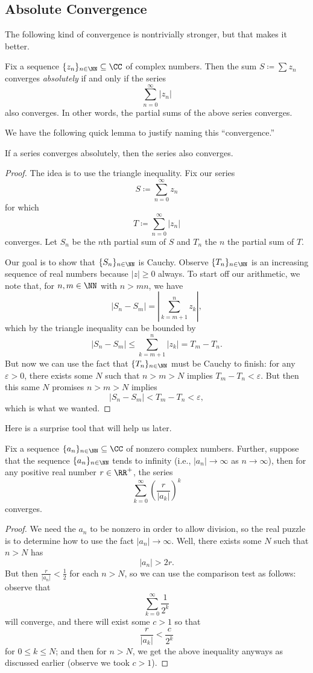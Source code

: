 \subsection{Absolute Convergence}
The following kind of convergence is nontrivially stronger, but that makes it better.
\begin{definition}
	Fix a sequence $\{z_n\}_{n\in\NN}\subseteq\CC$ of complex numbers. Then the sum $S\coloneqq\sum z_n$ converges \textit{absolutely} if and only if the series
	\[\sum_{n=0}^\infty|z_n|\]
	also converges. In other words, the partial sums of the above series converges.
\end{definition}
We have the following quick lemma to justify naming this ``convergence.''
\begin{lemma}
	If a series converges absolutely, then the series also converges.
\end{lemma}
\begin{proof}
	The idea is to use the triangle inequality. Fix our series
	\[S\coloneqq\sum_{n=0}^\infty z_n\]
	for which
	\[T\coloneqq\sum_{n=0}^\infty|z_n|\]
	converges. Let $S_n$ be the $n$th partial sum of $S$ and $T_n$ the $n$ the partial sum of $T$.
	
	Our goal is to show that $\{S_n\}_{n\in\NN}$ is Cauchy. Observe $\{T_n\}_{n\in\NN}$ is an increasing sequence of real numbers because $|z|\ge0$ always. To start off our arithmetic, we note that, for $n,m\in\NN$ with $n>mn$, we have
	\[|S_n-S_m|=\left|\sum_{k=m+1}^nz_k\right|,\]
	which by the triangle inequality can be bounded by
	\[|S_n-S_m|\le\sum_{k=m+1}^n|z_k|=T_m-T_n.\]
	But now we can use the fact that $\{T_n\}_{n\in\NN}$ must be Cauchy to finish: for any $\varepsilon>0$, there exists some $N$ such that $n>m>N$ implies $T_m-T_n<\varepsilon$. But then this same $N$ promises $n>m>N$ implies
	\[|S_n-S_m|<T_m-T_n<\varepsilon,\]
	which is what we wanted.
\end{proof}
Here is a surprise tool that will help us later.
\begin{lemma}
	Fix a sequence $\{a_n\}_{n\in\NN}\subseteq\CC$ of nonzero complex numbers. Further, suppose that the sequence $\{a_n\}_{n\in\NN}$ tends to infinity (i.e., $|a_n|\to\infty$ as $n\to\infty$), then for any positive real number $r\in\RR^+$, the series
	\[\sum_{k=0}^\infty\left(\frac r{|a_k|}\right)^k\]
	converges.
\end{lemma}
\begin{proof}
	We need the $a_n$ to be nonzero in order to allow division, so the real puzzle is to determine how to use the fact $|a_n|\to\infty$. Well, there exists some $N$ such that $n>N$ has
	\[|a_n|>2r.\]
	But then $\frac r{|a_n|}<\frac12$ for each $n>N$, so we can use the comparison test as follows: observe that
	\[\sum_{k=0}^\infty\frac1{2^k}\]
	will converge, and there will exist some $c>1$ so that
	\[\frac r{|a_k|}<\frac c{2^k}\]
	for $0\le k\le N$; and then for $n>N$, we get the above inequality anyways as discussed earlier (observe we took $c>1$).
\end{proof}
